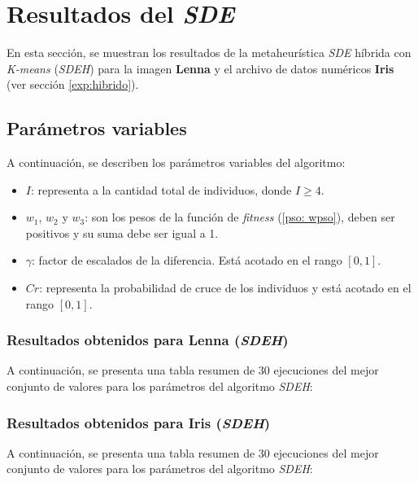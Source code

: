 \section{Resultados del \emph{SDE}}

    En esta sección, se muestran los resultados de la metaheurística  \emph{SDE}
híbrida con \emph{K-means} (\emph{SDEH}) para la imagen \textbf{Lenna} y el
archivo de datos numéricos \textbf{Iris} (ver sección \ref{exp:hibrido}).

\subsection{Parámetros variables}\label{sect:isde-pv}

    A continuación, se describen los parámetros variables del algoritmo:
\begin{itemize}
    \item $I$: representa a la cantidad total de individuos, donde $I \geq 4$.
    \item $w_1$, $w_2$ y $w_3$: son los pesos de la función de \emph{fitness}
(\ref{pso: wpso}), deben ser positivos y su suma debe ser igual a 1.
    \item $\gamma$: factor de escalados de la diferencia. Está acotado en el rango $[0, 1]$.
    \item $Cr$: representa la probabilidad de cruce  de los individuos y
está acotado en el rango $[0, 1]$.
\end{itemize}

\subsubsection{Resultados obtenidos para \textbf{Lenna} (\emph{SDEH})}

    A continuación, se presenta una tabla resumen de 30 ejecuciones del mejor
conjunto de valores para los parámetros del algoritmo \emph{SDEH}:



\subsubsection{Resultados obtenidos para \textbf{Iris} (\emph{SDEH})}

    A continuación, se presenta una tabla resumen de 30 ejecuciones del mejor
conjunto de valores para los parámetros del algoritmo \emph{SDEH}:



